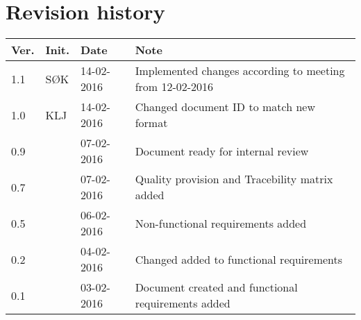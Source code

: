 \label{chp_revisionHistory}
\chapter{Revision history}

\begin{tabular}{b{1cm} b{1cm} b{2cm} b{8cm}}
    \textbf{Ver.} & \textbf{Init.} & \textbf{Date} & \textbf{Note} \\
    \hline
    1.1 & SØK & 14-02-2016 & Implemented changes according to meeting from 12-02-2016 \\ 
    1.0 & KLJ & 14-02-2016 & Changed document ID to match new format \\
    0.9 & & 07-02-2016 & Document ready for internal review \\
    0.7 & & 07-02-2016 & Quality provision and Tracebility matrix added \\
    0.5 & & 06-02-2016 & Non-functional requirements added \\
    0.2 & & 04-02-2016 & Changed added to functional requirements \\
    0.1 & & 03-02-2016 & Document created and functional requirements added  \\
\end{tabular}